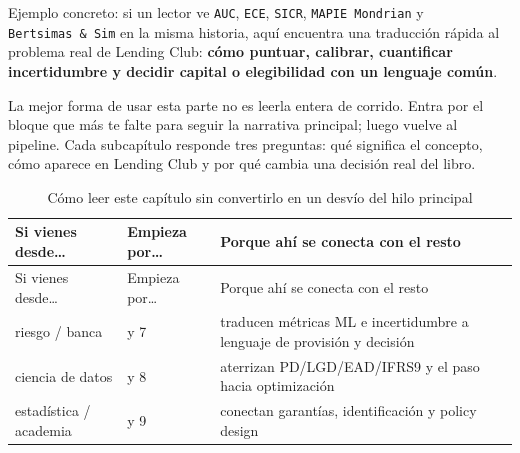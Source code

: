 \documentclass[
  spanish,
  11pt,
  letterpaper,
]{scrbook}
\theoremstyle{plain}
\theoremstyle{remark}
\begin{document}
Ejemplo concreto: si un lector ve \texttt{AUC}, \texttt{ECE},
\texttt{SICR}, \texttt{MAPIE\ Mondrian} y \texttt{Bertsimas\ \&\ Sim} en
la misma historia, aquí encuentra una traducción rápida al problema real
de Lending Club: \textbf{cómo puntuar, calibrar, cuantificar
incertidumbre y decidir capital o elegibilidad con un lenguaje común}.

La mejor forma de usar esta parte no es leerla entera de corrido. Entra
por el bloque que más te falte para seguir la narrativa principal; luego
vuelve al pipeline. Cada subcapítulo responde tres preguntas: qué
significa el concepto, cómo aparece en Lending Club y por qué cambia una
decisión real del libro.

\begin{longtable}[]{@{}
  >{\raggedright\arraybackslash}p{}
  >{\raggedright\arraybackslash}p{}
  >{\raggedright\arraybackslash}p{}@{}}
\caption{Cómo leer este capítulo sin convertirlo en un desvío del hilo
principal}\label{tbl-glossary-reading-paths}\tabularnewline
\toprule\noalign{}
\begin{minipage}[b]{\linewidth}\raggedright
Si vienes desde\ldots{}
\end{minipage} & \begin{minipage}[b]{\linewidth}\raggedright
Empieza por\ldots{}
\end{minipage} & \begin{minipage}[b]{\linewidth}\raggedright
Porque ahí se conecta con el resto
\end{minipage} \\
\midrule\noalign{}
\endfirsthead
\toprule\noalign{}
\begin{minipage}[b]{\linewidth}\raggedright
Si vienes desde\ldots{}
\end{minipage} & \begin{minipage}[b]{\linewidth}\raggedright
Empieza por\ldots{}
\end{minipage} & \begin{minipage}[b]{\linewidth}\raggedright
Porque ahí se conecta con el resto
\end{minipage} \\
\midrule\noalign{}
\endhead
\bottomrule\noalign{}
\endlastfoot
riesgo / banca & 6 y 7 & traducen métricas ML e incertidumbre a lenguaje
de provisión y decisión \\
ciencia de datos & 5 y 8 & aterrizan PD/LGD/EAD/IFRS9 y el paso hacia
optimización \\
estadística / academia & 7 y 9 & conectan garantías, identificación y
policy design \\
\end{longtable}
\end{document}
